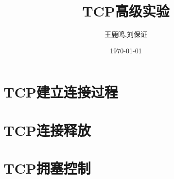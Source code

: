 \documentclass[11pt, a4paper,oneside]{book}
\theoremstyle{ocrenumbox}
\theoremstyle{purplenumbox}
\theoremstyle{blackbox}
\begin{document}
\pagestyle{empty} %
\title{TCP高级实验}
\author{王鹿鸣,刘保证}
\date{\today}
\maketitle
\setcounter{secnumdepth}{3}
\frontmatter
\tableofcontents

\mainmatter
\pagestyle{fancy}



\chapter{TCP建立连接过程}
\minitoc
    
    

\chapter{TCP连接释放}
\minitoc



\chapter{TCP拥塞控制}
\minitoc





\end{document}
